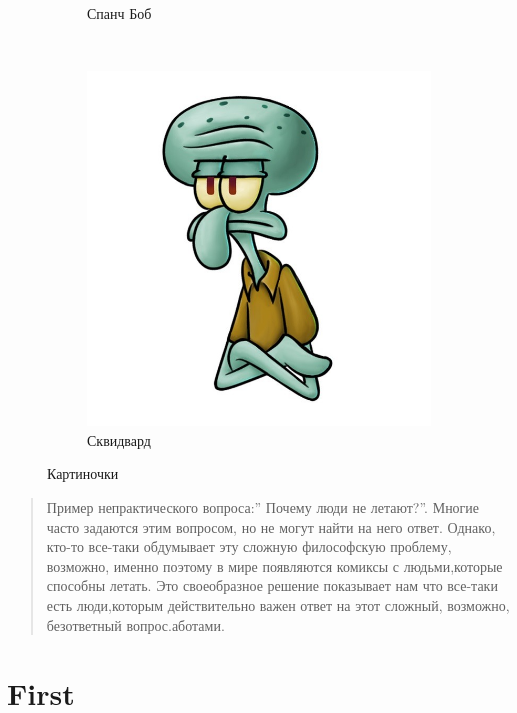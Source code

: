 \documentclass{report}
\begin{document}
\begin{figure}
\begin{subfigure}[b]{0.3\textwidth}
        \caption{Спанч Боб}
        \label{fig:tiger}
    \end{subfigure}
    ~ %
    \begin{subfigure}[b]{0.3\textwidth}
        \includegraphics[width=\textwidth]{squidward.jpeg}
        \caption{Сквидвард}
        \label{fig:mouse}
    \end{subfigure}
    \caption{Картиночки}\label{fig:animals}
\end{figure}

\begin{abstract}
    Пример непрактического вопроса:” Почему люди не летают?”. Многие часто задаются этим вопросом, но не могут найти на него ответ. Однако, кто-то все-таки обдумывает эту сложную философскую проблему, возможно, именно поэтому в мире появляются комиксы с людьми,которые способны летать. Это своеобразное решение показывает нам что все-таки есть люди,которым действительно важен ответ на этот сложный, возможно, безответный вопрос.аботами.
\end{abstract}

\tableofcontents
\part{First}
\end{document}
